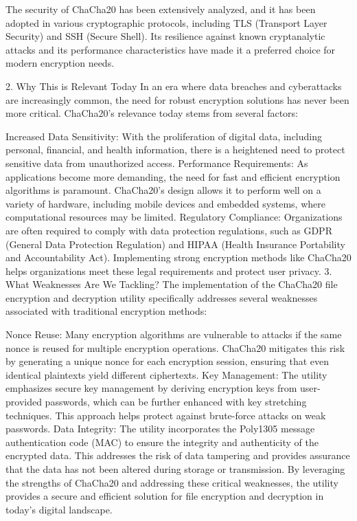 \documentclass[a4paper,12pt]{report}
\begin{document}
The security of ChaCha20 has been extensively analyzed, and it has been adopted in various cryptographic protocols, including TLS (Transport Layer Security) and SSH (Secure Shell).
Its resilience against known cryptanalytic attacks and its performance characteristics have made it a preferred choice for modern encryption needs.

2.
Why This is Relevant Today
In an era where data breaches and cyberattacks are increasingly common, the need for robust encryption solutions has never been more critical.
ChaCha20's relevance today stems from several factors:

Increased Data Sensitivity: With the proliferation of digital data, including personal, financial, and health information, there is a heightened need to protect sensitive data from unauthorized access.
Performance Requirements: As applications become more demanding, the need for fast and efficient encryption algorithms is paramount.
ChaCha20's design allows it to perform well on a variety of hardware, including mobile devices and embedded systems, where computational resources may be limited.
Regulatory Compliance: Organizations are often required to comply with data protection regulations, such as GDPR (General Data Protection Regulation) and HIPAA (Health Insurance Portability and Accountability Act).
Implementing strong encryption methods like ChaCha20 helps organizations meet these legal requirements and protect user privacy.
3.
What Weaknesses Are We Tackling?
The implementation of the ChaCha20 file encryption and decryption utility specifically addresses several weaknesses associated with traditional encryption methods:

Nonce Reuse: Many encryption algorithms are vulnerable to attacks if the same nonce is reused for multiple encryption operations.
ChaCha20 mitigates this risk by generating a unique nonce for each encryption session, ensuring that even identical plaintexts yield different ciphertexts.
Key Management: The utility emphasizes secure key management by deriving encryption keys from user-provided passwords, which can be further enhanced with key stretching techniques.
This approach helps protect against brute-force attacks on weak passwords.
Data Integrity: The utility incorporates the Poly1305 message authentication code (MAC) to ensure the integrity and authenticity of the encrypted data.
This addresses the risk of data tampering and provides assurance that the data has not been altered during storage or transmission.
By leveraging the strengths of ChaCha20 and addressing these critical weaknesses, the utility provides a secure and efficient solution for file encryption and decryption in today's digital landscape.
\end{document}
